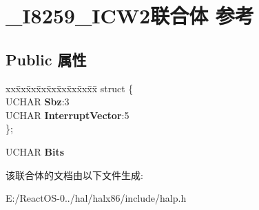 \hypertarget{union___i8259___i_c_w2}{}\section{\+\_\+\+I8259\+\_\+\+I\+C\+W2联合体 参考}
\label{union___i8259___i_c_w2}
\subsection*{Public 属性}
\begin{DoxyCompactItemize}
\item 
\mbox{\label{union___i8259___i_c_w2_a1213a365cd82f03e38839d521125eeca}} 
\begin{tabbing}
xx\=xx\=xx\=xx\=xx\=xx\=xx\=xx\=xx\=\kill
struct \{\\
\>UCHAR {\bfseries Sbz}:3\\
\>UCHAR {\bfseries InterruptVector}:5\\
\}; \\

\end{tabbing}\item 
\mbox{\label{union___i8259___i_c_w2_abec7f0b2d4bd2fbee544f3cf64515ec8}} 
U\+C\+H\+AR {\bfseries Bits}
\end{DoxyCompactItemize}


该联合体的文档由以下文件生成\+:\begin{DoxyCompactItemize}
\item 
E\+:/\+React\+O\+S-\/0../hal/halx86/include/halp.\+h\end{DoxyCompactItemize}
